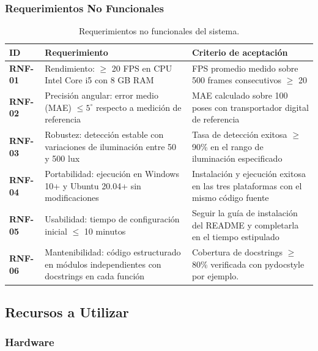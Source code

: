 \subsubsection*{Requerimientos No Funcionales}

\begin{table}[H]
\centering
\label{tab:req_nofunc}
\renewcommand{\arraystretch}{1.3}
\begin{tabularx}{\textwidth}{
    >{\bfseries}p{1.1cm}
    X
    X
}
\toprule
\textbf{ID} &
\textbf{Requerimiento} &
\textbf{Criterio de aceptación} \\
\midrule
RNF-01 &
  Rendimiento: $\geq$ 20 FPS en CPU Intel Core i5 con 8 GB RAM &
  FPS promedio medido sobre 500 frames consecutivos $\geq$ 20 \\
\midrule
RNF-02 &
  Precisión angular: error medio (MAE) $\leq 5^\circ$ respecto a medición
  de referencia &
  MAE calculado sobre 100 poses con transportador digital de referencia \\
\midrule
RNF-03 &
  Robustez: detección estable con variaciones de iluminación entre
  50 y 500 lux &
  Tasa de detección exitosa $\geq$ 90\% en el rango de iluminación
  especificado \\
\midrule
RNF-04 &
  Portabilidad: ejecución en Windows 10+ y Ubuntu 20.04+
  sin modificaciones &
  Instalación y ejecución exitosa en las tres plataformas con el mismo
  código fuente \\
\midrule
RNF-05 &
  Usabilidad: tiempo de configuración inicial $\leq$ 10 minutos &
  Seguir la guía de instalación del README y completarla en el tiempo
  estipulado \\
\midrule
RNF-06 &
  Mantenibilidad: código estructurado en módulos independientes con
  docstrings en cada función &
  Cobertura de docstrings $\geq$ 80\% verificada con pydocstyle por ejemplo. \\
\bottomrule
\end{tabularx}
\caption{Requerimientos no funcionales del sistema.}
\end{table}

\subsection{Recursos a Utilizar}

\subsubsection*{Hardware}

